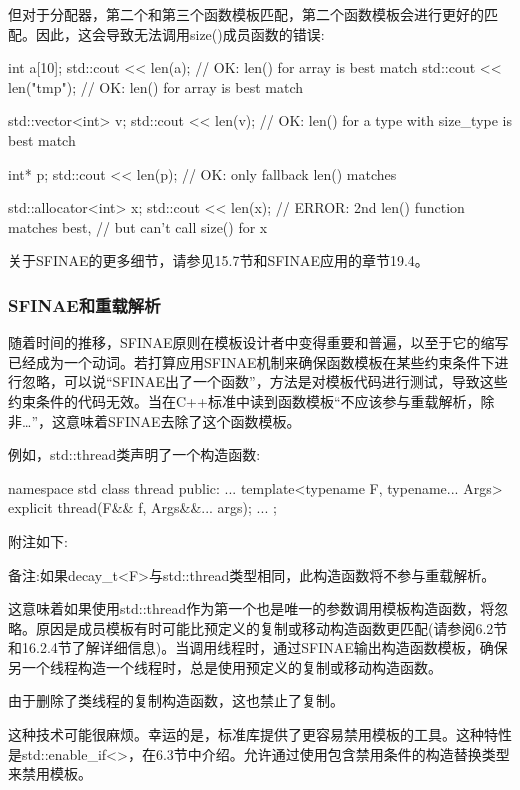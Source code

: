 但对于分配器，第二个和第三个函数模板匹配，第二个函数模板会进行更好的匹配。因此，这会导致无法调用size()成员函数的错误:

\begin{cpp}
int a[10];
std::cout << len(a); // OK: len() for array is best match
std::cout << len("tmp"); // OK: len() for array is best match

std::vector<int> v;
std::cout << len(v); // OK: len() for a type with size_type is best match

int* p;
std::cout << len(p); // OK: only fallback len() matches

std::allocator<int> x;
std::cout << len(x); // ERROR: 2nd len() function matches best,
					 // but can't call size() for x
\end{cpp}

关于SFINAE的更多细节，请参见15.7节和SFINAE应用的章节19.4。

\subsubsection{SFINAE和重载解析}

随着时间的推移，SFINAE原则在模板设计者中变得重要和普遍，以至于它的缩写已经成为一个动词。若打算应用SFINAE机制来确保函数模板在某些约束条件下进行忽略，可以说“SFINAE出了一个函数”，方法是对模板代码进行测试，导致这些约束条件的代码无效。当在C++标准中读到函数模板“不应该参与重载解析，除非…”，这意味着SFINAE去除了这个函数模板。

例如，std::thread类声明了一个构造函数:

\begin{cpp}
namespace std {
class thread {
public:
	...
	template<typename F, typename... Args>
	explicit thread(F&& f, Args&&... args);
	...
};
}
\end{cpp}

附注如下:

备注:如果decay\_t<F>与std::thread类型相同，此构造函数将不参与重载解析。

这意味着如果使用std::thread作为第一个也是唯一的参数调用模板构造函数，将忽略。原因是成员模板有时可能比预定义的复制或移动构造函数更匹配(请参阅6.2节和16.2.4节了解详细信息)。当调用线程时，通过SFINAE输出构造函数模板，确保另一个线程构造一个线程时，总是使用预定义的复制或移动构造函数。

\begin{notice}
由于删除了类线程的复制构造函数，这也禁止了复制。
\end{notice}

这种技术可能很麻烦。幸运的是，标准库提供了更容易禁用模板的工具。这种特性是std::enable\_if<>，在6.3节中介绍。允许通过使用包含禁用条件的构造替换类型来禁用模板。

